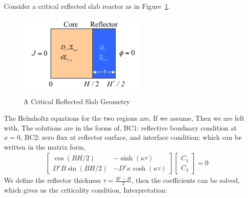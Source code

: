 \documentclass{school-22.211-notes}
\begin{document}
\clearpage
{}
Consider a critical reflected slab reactor as in Figure~\ref{reflected-slab}. 
\begin{figure}
  \centering
\includegraphics[width=2.5in]{images/dfs/reflected-slab.png}
\caption{A Critical Reflected Slab Geometry} \label{reflected-slab}
\end{figure}
The Helmholtz equations for the two regions are,
If we assume,
Then we are left with,
The solutions are in the forms of,
BC1: reflective boudnary condition at $x=0$,
BC2: zero flux at reflector surface, 
and interface condition: 
which can be written in the matrix form, 
\begin{align}
\left[ \begin{array}{cc}
\cos (BH/2) & -\sinh(\kappa \tau) \\
D^c B \sin(BH/2) & -D^r \kappa \cosh(\kappa \tau) 
\end{array} \right] 
\left[ \begin{array}{c} 
C_1 \\ C_4 \end{array} \right] = 0
\end{align}
We define the reflector thickness $\tau = \frac{H' - H}{2}$, then the coefficients can be solved,
which gives us the criticality condition,
Interpretation:
\end{document}
